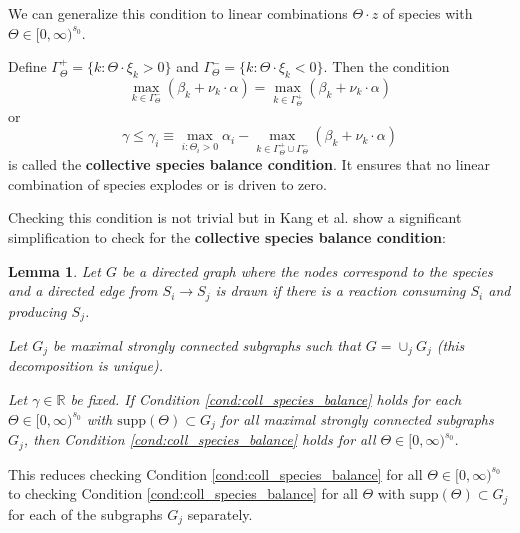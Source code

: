 \documentclass[english]{article}
\begin{document}
We can generalize this condition to linear combinations
$\Theta \cdot z$ of species with $\Theta \in[0, \infty)^{s_{0}}$.

\begin{condition}
\label{cond:coll_species_balance}
Define $\Gamma_{\Theta}^{+} = \{ k: \Theta \cdot \xi_{k} > 0 \}$ and
	$\Gamma_{\Theta}^{-} = \{ k: \Theta \cdot \xi_{k} < 0 \}$.
	Then the condition
\begin{equation}
    \label{cond:coll_species_balance1}
    \underset{k \in \Gamma_{\Theta}^{-}}{\max} \left(
		\beta_{k} + \nu_{k} \cdot \alpha
	\right) = \underset{k \in \Gamma_{\Theta}^{+}}{\max} \left(
		\beta_{k} + \nu_{k} \cdot \alpha
	\right)
\end{equation}
or
\begin{equation}
    \label{cond:coll_species_balance2}
    \gamma \leq \gamma_{i} \equiv \underset{i: \Theta_{i} > 0}{\max}
		\alpha_{i} - \underset{
			k \in \Gamma_{\Theta}^{+} \cup \Gamma_{\Theta}^{-}
		}{\max} \left( \beta_{k} + \nu_{k} \cdot \alpha \right)
\end{equation}
is called the \textbf{collective species balance condition}. It
ensures that no linear combination of species explodes or is driven
to zero.
\end{condition}



Checking this condition is not trivial but in
\cite{kang2013separation} Kang et al. show a significant
simplification to check for the \textbf{collective species balance
condition}:

\newtheorem{lemma}{Lemma}
\label{lemma:coll_species_balance_graph}

\begin{lemma}
Let $G$ be a directed graph where the nodes correspond to the species
and a directed edge from $S_{i} \rightarrow S_{j}$ is drawn
if there is a reaction consuming $S_{i}$ and producing $S_{j}$.

Let $G_{j}$ be maximal strongly connected subgraphs such that
$G = \cup_{j} G_{j}$ (this decomposition is unique).

Let $\gamma \in \mathbb{R}$ be fixed. If Condition
\ref{cond:coll_species_balance} holds for each
$\Theta \in [0, \infty)^{s_0}$ with
$\mbox{supp} \left( \Theta \right) \subset G_j$ for all maximal
strongly connected subgraphs $G_j$, then Condition
\ref{cond:coll_species_balance} holds for all
$\Theta \in [0, \infty)^{s_0}$.
\end{lemma}

This reduces checking Condition \ref{cond:coll_species_balance} for
all $\Theta \in[0, \infty)^{s_{0}}$ to checking Condition
\ref{cond:coll_species_balance} for all $\Theta$ with
$\mbox{supp} \left( \Theta \right) \subset G_{j}$
for each of the subgraphs $G_{j}$ separately.
\end{document}
